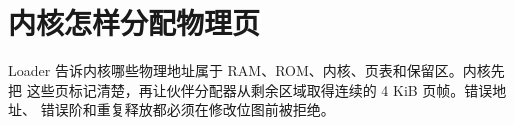 \chapter{内核怎样分配物理页}

Loader 告诉内核哪些物理地址属于 RAM、ROM、内核、页表和保留区。内核先把
这些页标记清楚，再让伙伴分配器从剩余区域取得连续的 4 KiB 页帧。错误地址、
错误阶和重复释放都必须在修改位图前被拒绝。



